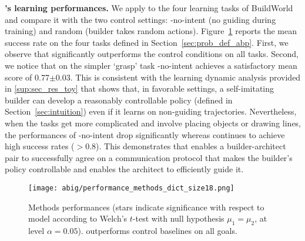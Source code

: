 \textbf{\abig's learning performances.} We apply \abig to the four learning tasks of BuildWorld and compare it with the two control settings: \abig-no-intent (no guiding during training) and random (builder takes random actions). Figure~\ref{fig:methods_performance} reports the mean success rate on the four tasks defined in Section~\ref{sec:prob_def_abp}. First, we observe that \abim significantly outperforms the control conditions on all tasks. Second, we notice that on the simpler `grasp' task \abim-no-intent achieves a satisfactory mean score of 0.77$\pm0.03$. This is consistent with the learning dynamic analysis provided in \ap\ref{sup:sec_res_toy} that shows that, in favorable settings, a self-imitating builder can develop a reasonably controllable policy (defined in Section~\ref{sec:intuition}) even if it learns on non-guiding trajectories.
Nevertheless, when the tasks get more complicated and involve placing objects or drawing lines, the performances of \abim-no-intent drop significantly whereas \abim continues to achieve high success rates ($>0.8$). 
This demonstrates that \abim enables a builder-architect pair to successfully agree on a communication protocol that makes the builder's policy controllable and enables the architect to efficiently guide it. 
%
\begin{figure}[!h]
    \centering
    \vspace{-.2cm}
    \texttt{[image: abig/performance\_methods\_dict\_size18.png]}
    \vspace{-.3cm}
    \caption{Methods performances (stars indicate significance with respect to \abim model according to Welch's $t$-test with null hypothesis $\mu_1=\mu_2$, at level $\alpha=0.05$). \abig outperforms control baselines on all goals.}
    \label{fig:methods_performance}
\end{figure}
%
